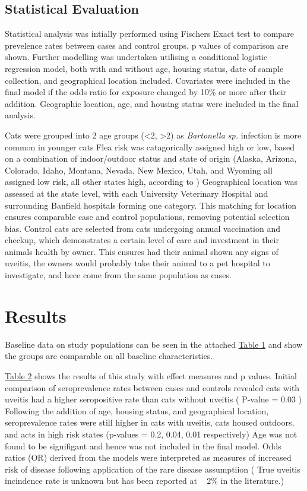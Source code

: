 \documentclass[11pt,twocolumn]{article}
\begin{document}
	\newpage
	\subsection{Statistical Evaluation}

		Statistical analysis was intially performed using Fischers Exact test to compare prevelence rates between cases and control groups. p values of comparison are shown.
		Further modelling was undertaken utilising a conditional logistic regression model, both with and without age, housing status, date of sample collection, and geographical location included. 
		Covariates were included in the final model if the odds ratio for exposure changed by 10\% or more after their addition.
		Geographic location, age, and housing status were included in the final analysis.


		Cats were grouped into 2 age groups (\textless 2, \textgreater 2) as \emph{Bartonella sp.} infection is more common in younger cats
		Flea risk was catagorically assigned high or low, based on a combination of indoor/outdoor status and state of origin (Alaska, Arizona, Colorado, Idaho, Montana, Nevada, New Mexico, Utah, and Wyoming all assigned low risk, all other states high, according to \cite{Jameson1995a})
		Geographical location was assessed at the state level, with each University Veterinary Hospital and surrounding Banfield hospitals forming one category.
		This matching for location ensures comparable case and control populations, removing potential selection bias. 
		Control cats are selected from cats undergoing annual vaccination and checkup, which demonstrates a certain level of care and investment in their animals health by owner. This ensures had their animal shown any signs of uveitis, the owners would probably take their animal to a pet hospital to investigate, and hece come from the same population as cases.


		\newpage
\section{Results}


		Baseline data on study populations can be seen in the attached \hyperref[tab:1]{Table 1} and show the groups are comparable on all baseline characteristics.


		\hyperref[tab:2]{Table 2} shows the results of this study with effect measures and p values. 
		Initial comparison of seroprevalence rates between cases and controls revealed cats with uveitis had a higher seropositive rate than cats without uveitis ( P-value = 0.03 ) 
		Following the addition of age, housing status, and geographical location, seroprevalence rates were still higher in cats with uveitis, cats housed outdoors, and acts in high risk states (p-values = 0.2, 0.04, 0.01 respectively)
		Age was not found to be signifigant and hence was not included in the final model.
		Odds ratios (OR) derived from the models were interpreted as measures of increased risk of disease following application of the rare disease assumptiion ( True uveitis incindence rate is unknown but has been reported at ~ 2\% in the literature.)
\end{document}
